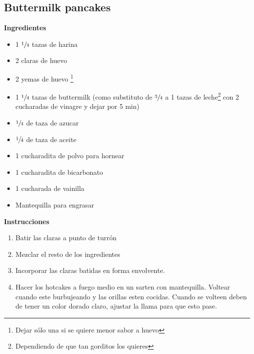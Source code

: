 \subsection{Buttermilk pancakes}

\textbf{Ingredientes}
\begin{itemize}
\item 1 $\sfrac{1}{4}$ tazas de harina
\item 2 claras de huevo
\item 2 yemas de huevo \footnote{Dejar sólo una si se quiere menor sabor a huevo}
\item 1 $\sfrac{1}{4}$ tazas de buttermilk (como substituto  de  $\sfrac{3}{4}$ a 1 tazas de leche\footnote{Dependiendo de que tan gorditos los quieres} con 2 cucharadas de vinagre y dejar por 5 min)
\item $\sfrac{1}{4}$ de taza de azucar
\item $\sfrac{1}{4}$ de taza de aceite
\item 1 cucharadita de polvo para hornear
\item 1 cucharadita de bicarbonato
\item 1 cucharada de vainilla
\item Mantequilla para engrasar
\end{itemize}

\textbf{Instrucciones}
\begin{enumerate}
\item Batir las claras a punto de turrón
\item Mezclar el resto de los ingredientes
\item Incorporar las claras batidas en forma envolvente.
\item Hacer los hotcakes a fuego medio en un sarten con mantequilla. Voltear cuando este burbujeando y las orillas esten cocidas. Cuando se volteen deben de tener un color dorado claro, ajustar la llama para que esto pase.
\end{enumerate}